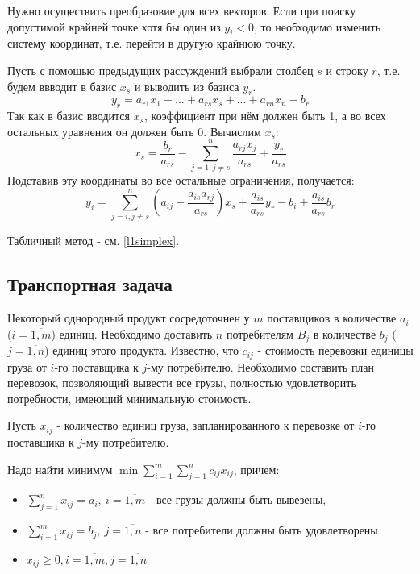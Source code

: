\documentclass[a4paper, 14pt]{extarticle}
\numberwithin{equation}{section}
\begin{document}
Нужно осуществить преобразовие для всех векторов. Если при поиску допустимой крайней точке хотя бы один из $y_i<0$, то необходимо изменить систему координат, т.е. перейти в другую крайнюю точку. 

Пусть с помощью предыдущих рассуждений выбрали столбец $s$ и строку $r$, т.е. будем ввводит в базис $x_s$ и выводить из базиса $y_r$.
\[ y_r=a_{r1} x_1 + ... + a_{rs}x_s + ... + a_{rn} x_n - b_r \]
Так как в базис вводится $x_s$, коэффициент при нём должен быть 1, а во всех остальных уравнения он должен быть 0. Вычислим $x_s$:
\begin{equation}
    \label{eq:simplex:xs}
    x_s = \frac{b_r}{a_{rs}}  - \sum^{n}_{j=1; j\ne s} \frac{a_{rj} x_j}{a_{rs}} + \frac{y_r}{a_{rs}}  
\end{equation}
Подставив эту координаты во все остальные ограничения, получается:
\begin{equation}
    \label{eq:simplex:yi}
    y_i = \sum^n_{j=i, j \ne s} \left( a_{ij} - \frac{a_{is} a_{rj}}{a_{rs}} \right) x_s + \frac{a_{is}}{a_{rs}} y_r - b_i  + \frac{a_{is}}{a_{rs}} b_r 
\end{equation}

Табличный метод - см. \ref{l1simplex}.

\subsection{Транспортная задача}
Некоторый однородный продукт сосредоточнен у $m$ поставщиков в количестве $a_i$ ($i= \overline{1,m} $) единиц. Необходимо доставить $n$ потребителям $B_j$ в количестве $b_j$ ($j = \overline{1,n} $) единиц этого продукта. Известно, что $c_{ij}$ - стоимость перевозки единицы груза от $i$-го поставщика к $j$-му потребителю. Необходимо составить план перевозок, позволяющий вывести все грузы, полностью удовлетворить потребности, имеющий минимальную стоимость.

Пусть $x_{ij}$ - количество единиц груза, запланированного к перевозке от $i$-го поставщика к $j$-му потребителю.

Надо найти минимум $\min \sum\limits^{m}_{i=1} \sum\limits^{n}_{j=1} c_{ij}x_{ij} $, причем:
\begin{itemize}
    \item $ \sum\limits^{n}_{j=1} x_{ij} = a_i, \ i=\overline{1,m} $ - все грузы должны быть вывезены,
    \item $ \sum\limits^{m}_{i=1} x_{ij} = b_j, \ j= \overline{1,n}  $ - все потребители должны быть удовлетворены
    \item $x_{ij} \ge 0, i = \overline{1,m}, j= \overline{1,n}  $
\end{itemize}
\end{document}
